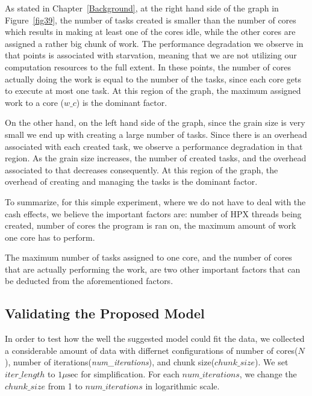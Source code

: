 As stated in Chapter~\ref{Background}, at the right hand side of the graph in Figure~\ref{fig39}, the number of tasks created is smaller than the number of cores which results in making at least one of the cores idle, while the other cores are assigned a rather big chunk of work. The performance degradation we observe in that points is associated with starvation, meaning that we are not utilizing our computation resources to the full extent. In these points, the number of cores actually doing the work is equal to the number of the tasks, since each core gets to execute at most one task. At this region of the graph, the maximum assigned work to a core ($w\_c$) is the dominant factor.   

On the other hand, on the left hand side of the graph, since the grain size is very small we end up with creating a large number of tasks. Since there is an overhead associated with each created task, we observe a performance degradation in that region. As the grain size increases, the number of created tasks, and the overhead associated to that decreases consequently. At this region of the graph, the overhead of creating and managing the tasks is the dominant factor.   

To summarize, for this simple experiment, where we do not have to deal with the cash effects, we believe the important factors are: number of HPX threads being created, number of cores the program is ran on, the maximum amount of work one core has to perform. 

The maximum number of tasks assigned to one core, and the number of cores that are actually performing the work, are two other important factors that can be deducted from the aforementioned factors. 


\vspace{\baselineskip}
\subsection{Validating the Proposed Model}
In order to test how the well the suggested model could fit the data, we collected a considerable amount of data with differnet configurations of number of cores($N$), number of iterations(\emph{num\_{iterations}}), and chunk size($chunk\_{size}$). We set $iter\_{length}$ to $1\mu\text{sec}$ for simplification. For each $num\_{iterations}$, we change the $chunk\_{size}$ from 1 to $num\_{iterations}$ in logarithmic scale. 



\vspace{\baselineskip}
